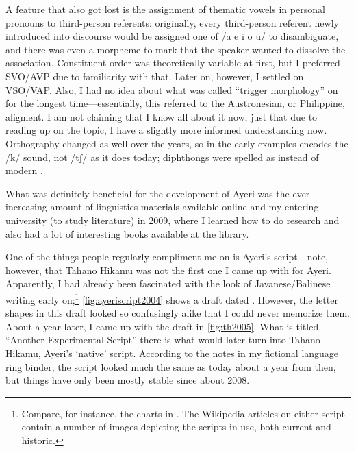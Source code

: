 A feature that also got lost is the assignment of thematic vowels in personal 
pronouns to third-person referents: originally, every third-person referent 
newly introduced into discourse would be assigned one of /a e i o u/ to 
disambiguate, and there was even a morpheme to mark that the speaker wanted to 
dissolve the association. Constituent order was theoretically variable at first, 
but I preferred SVO/AVP due to familiarity with that. Later on, however, I 
settled on VSO/VAP. Also, I had no idea about what was called 
``trigger morphology'' on  for the longest time---essentially, 
this referred to the Austronesian, or Philippine, aligment. I am not claiming 
that I know all about it now, just that due to reading up on the topic, I have 
a slightly more informed understanding now. Orthography changed as well over 
the years, so  in the early examples encodes the /k/ sound, not /tʃ/ as 
it does today; diphthongs were spelled as  instead of modern .

What was definitely beneficial for the development of Ayeri was the ever 
increasing amount of linguistics materials available online and my entering 
university (to study literature) in 2009, where I learned how to do research 
and also had a lot of interesting books available at the library.

One of the things people regularly compliment me on is Ayeri's script---note, 
however, that Tahano Hikamu was not the first one I came up 
with for Ayeri. Apparently, I had already been fascinated with the look of 
Javanese/Balinese writing early on;\footnote{Compare, for instance, the charts 
in \citet{kuipersmcdermott1996}. The Wikipedia articles on either script contain 
a number of images depicting the scripts in use, both current and historic.} 
\autoref{fig:ayeriscript2004} shows a draft dated . 
However, the letter shapes in this draft looked so confusingly alike that I 
could never memorize them. About a year later, I came up with the draft in 
\autoref{fig:th2005}. What is titled ``Another Experimental Script'' there is 
what would later turn into Tahano Hikamu, Ayeri's `native' script. According to 
the notes in my fictional language ring binder, the script looked much the same 
as today about a year from then, but things have only been mostly stable since 
about 2008.

